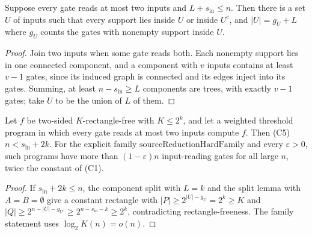 \begin{lemma}
  \label{lem:lowerbounds-threshold-components}
  \leanok
  Suppose every gate reads at most two inputs and $L+s_{\mathrm{in}}\le n$.
  Then there is a set $U$ of inputs such that every support lies inside $U$
  or inside $U^c$, and $|U|=g_U+L$ where $g_U$ counts the gates with nonempty
  support inside $U$.
\end{lemma}
\begin{proof}
  \leanok
  Join two inputs when some gate reads both. Each nonempty support lies in one
  connected component, and a component with $v$ inputs contains at least $v-1$
  gates, since its induced graph is connected and its edges inject into its
  gates. Summing, at least $n-s_{\mathrm{in}}\ge L$ components are trees,
  with exactly $v-1$ gates; take $U$ to be the union of $L$ of them.
\end{proof}

\begin{corollary}
  \label{cor:lowerbounds-threshold-component-bound}
  \leanok
  Let $f$ be two-sided $K$-rectangle-free with $K\le2^k$, and let a weighted
  threshold program in which every gate reads at most two inputs compute $f$.
  Then (C5) $n<s_{\mathrm{in}}+2k$. For the explicit family
  $\mathrm{sourceReductionHardFamily}$ and every $\varepsilon>0$, such programs
  have more than $(1-\varepsilon)n$ input-reading gates for all large $n$,
  twice the constant of (C1).
\end{corollary}
\begin{proof}
  \leanok
  If $s_{\mathrm{in}}+2k\le n$, the component split with $L=k$ and the split
  lemma with $A=B=\emptyset$ give a constant rectangle with
  $|P|\ge2^{|U|-g_U}=2^k\ge K$ and $|Q|\ge2^{n-|U|-g_{U^c}}\ge2^{n-s_{\mathrm{in}}-k}\ge2^k$,
  contradicting rectangle-freeness. The family statement uses
  $\log_2K(n)=o(n)$.
\end{proof}

